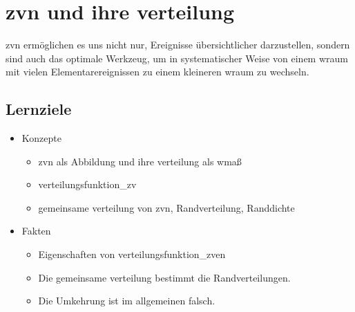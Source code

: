 


\chapter{\gls{zv}n und ihre \gls{verteilung}}\label{ch:zufallsvariablen-und-ihre-verteilung}
\gls{zv}n ermöglichen es uns nicht nur, Ereignisse übersichtlicher darzustellen, sondern sind auch
das optimale Werkzeug, um in systematischer Weise von einem \gls{wraum} mit vielen
Elementarereignissen zu einem kleineren \gls{wraum} zu wechseln.


\section*{Lernziele}
\begin{itemize}
    \item Konzepte
    \begin{itemize}
        \item \gls{zv}n als Abbildung und ihre \gls{verteilung} als \gls{wmaß}
        \item \gls{verteilungsfunktion_zv}
        \item gemeinsame \gls{verteilung} von \gls{zv}n, Randverteilung, Randdichte
    \end{itemize}
    \item Fakten
    \begin{itemize}
        \item Eigenschaften von \gls{verteilungsfunktion_zv}en
        \item Die gemeinsame \gls{verteilung} bestimmt die Randverteilungen.
        \item Die Umkehrung ist im allgemeinen falsch.
    \end{itemize}
\end{itemize}


